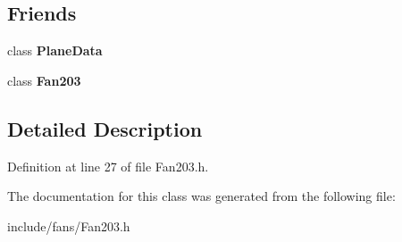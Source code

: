 \subsection*{Friends}
\begin{DoxyCompactItemize}
\item 
\mbox{\label{class_base_gas_density_a28ff438eefb65e97bddb4051dd0a0112}} 
class {\bfseries Plane\+Data}
\item 
\mbox{\label{class_base_gas_density_ace899f7afbdc2350f3651b93b809f2fd}} 
class {\bfseries Fan203}
\end{DoxyCompactItemize}


\subsection{Detailed Description}


Definition at line 27 of file Fan203.\+h.



The documentation for this class was generated from the following file\+:\begin{DoxyCompactItemize}
\item 
include/fans/Fan203.\+h\end{DoxyCompactItemize}
